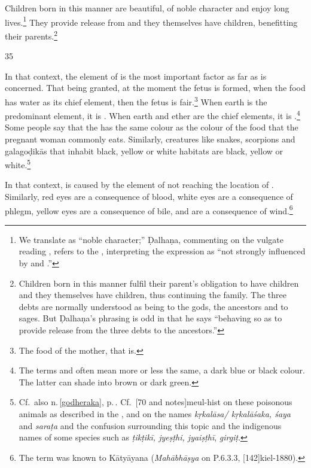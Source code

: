 \begin{translation}
Children born in this manner are beautiful, of noble character and
enjoy long lives.\footnote{We translate  as “noble
    character;” Ḍalhaṇa, commenting on the vulgate reading
    , refers to the , interpreting the
    expression as “not strongly influenced by  and
    .”}  They provide release from  and
    they themselves have children, benefitting their parents.\footnote{Children 
    born in this manner
        fulfil their parent's obligation to have children and they themselves
        have children, thus continuing the family.  The three debts are
        normally understood as being to the gods, the ancestors and to sages.
        But Ḍalhaṇa's phrasing is odd in that he says
         “behaving so as to provide release
        from the three debts to the ancestors.”} 

\item[35]

In that context, the element of  is the most important
factor as far as  is concerned. That being
granted, at the moment the fetus is formed, when the food has water as
its chief element, then the fetus is fair.\footnote{The food of the
    mother, that is.}  When earth is the predominant element, it is
    . When earth and ether are the chief elements, it is
    .\footnote{The terms  and 
        often mean more or less the same, a dark blue or black colour. The
        latter can shade into brown or dark green.}  Some people say that the
         has the same colour as the colour of the food
        that the pregnant woman commonly eats. Similarly, creatures like
        snakes, scorpions and \glspl{galagoḍikā} that inhabit black, yellow or
        white habitats are black, yellow or
        white.\footnote{\label{galagodika}Cf.\ also n.\,\ref{godheraka},
            p.\,\pageref{godheraka}. Cf.\ [70 and notes]{meul-hist} on
            these poisonous animals as described in the \CS, and
            \cite[455-456]{meul-1974} on the names \emph{kṛkalāsa\slash
            kṛkalāśaka, śaya} and \emph{saraṭa} and the confusion surrounding this
            topic and the indigenous names of some species such as \emph{ṭikṭikī,
            jyeṣṭhi, jyaiṣṭhī}, \emph{girgiṭ}.}
            
In that context,  is caused by
the element of  not reaching the location of
.  Similarly, red eyes are a consequence of blood,
white eyes are a consequence of phlegm, yellow eyes are a consequence
of bile, and  are a consequence of
wind.\footnote{The term  was known to Kātyāyana
    (\emph{Mahābhāṣya} on P.6.3.3, [142]{kiel-1880}).}
  

\end{translation}
